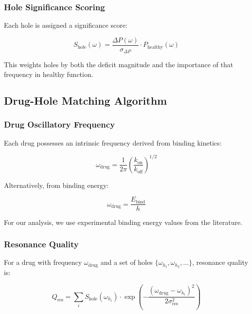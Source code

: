 \documentclass{article}
\begin{document}
\subsubsection{Hole Significance Scoring}

Each hole is assigned a significance score:

\begin{equation}
S_{\text{hole}}(\omega) = \frac{\Delta P(\omega)}{\sigma_{\Delta P}} \cdot P_{\text{healthy}}(\omega)
\end{equation}

This weights holes by both the deficit magnitude and the importance of that frequency in healthy function.

\subsection{Drug-Hole Matching Algorithm}

\subsubsection{Drug Oscillatory Frequency}

Each drug possesses an intrinsic frequency derived from binding kinetics:

\begin{equation}
\omega_{\text{drug}} = \frac{1}{2\pi} \left(\frac{k_{\text{on}}}{k_{\text{off}}}\right)^{1/2}
\end{equation}

Alternatively, from binding energy:

\begin{equation}
\omega_{\text{drug}} = \frac{E_{\text{bind}}}{h}
\end{equation}

For our analysis, we use experimental binding energy values from the literature.

\subsubsection{Resonance Quality}

For a drug with frequency $\omega_{\text{drug}}$ and a set of holes $\{\omega_{h_1}, \omega_{h_2}, \ldots\}$, resonance quality is:

\begin{equation}
Q_{\text{res}} = \sum_{i} S_{\text{hole}}(\omega_{h_i}) \cdot \exp\left(-\frac{(\omega_{\text{drug}} - \omega_{h_i})^2}{2\sigma_{\text{res}}^2}\right)
\end{equation}
\end{document}
